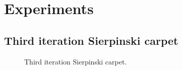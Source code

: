 \documentclass[a4paper,12pt]{article}
\begin{document}
\newpage
\section{Experiments}

\subsection{Third iteration Sierpinski carpet}

    \begin{figure}[h]
    \center
    
    \caption{Third iteration Sierpinski carpet.}
    \end{figure}


\begin{comment}
    Consider a lattice with $N$ atomic sites where each atom contributes exactly one electron to the valence band. Let $\mathbb{C}^N$ be the Hilbert space of our problem, where $N$ is the number of atomic sites. Here, we assume that each atom contributes exactly one electron to the valence band. $N$: $\operatorname{dim}\,\mathcal{H} = N$. The system is described by a hermitian hamiltonian $H \in \mathcal{B}\left(\mathcal{H}\right)$ with eigenenergies $E_i \in \mathbb{R}$ and eigenstates $|\psi_i\rangle \in \mathcal{H}$ (here, $i \in {0,\dots,N-1}$). 
    
    Within the RPA (Random Phase Approximation) we define the dielectic function as follows. Let electrons in the material be subject to an external perturbation $\hat V_\text{ext} \in \mathcal{B}(\mathcal{H})$ Dielectric function $\hat\varepsilon: \mathbb{R} \to \mathcal{B}\left(\mathcal{H}\right)$ is defined by
    \begin{equation*}
    |\phi_\text{ext}\rangle = \hat\varepsilon(\omega)|\phi_\text{tot}(\omega)\rangle\; ,
    \end{equation*}
    where $\phi_\text{tot}\rangle$ is the total potential in 



    We start with a simple tight-binding approximation where only nearest neighbour hoppings are non-zero. By exact diagonalization of the hamiltonian $\mathcal{H} \in \mathbb{C}^{N \times N}$ eigenenergies $E \in \mathbb{R}^N$ and eigenstates $\psi \in \mathbb{C}^{N \times N}$ are obtained.


\end{comment}
\end{document}
